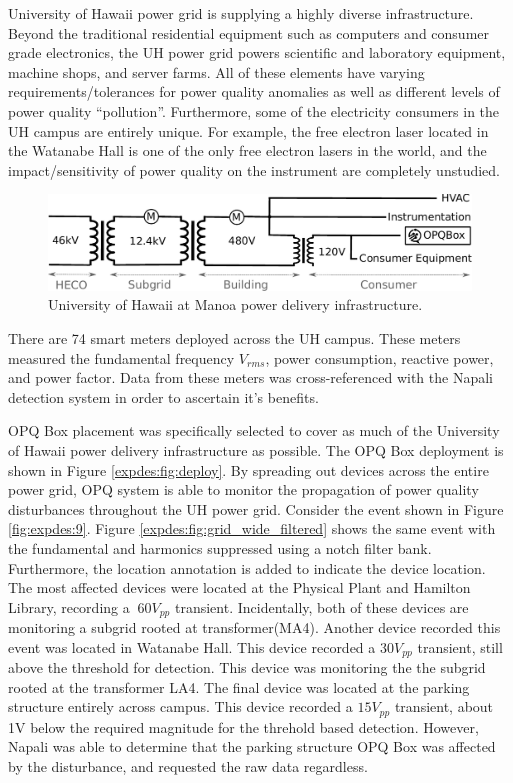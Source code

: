 University of Hawaii power grid is supplying a highly diverse infrastructure.
Beyond the traditional residential equipment such as computers and consumer grade electronics, the UH power grid powers scientific and laboratory equipment, machine shops, and server farms.
All of these elements have varying requirements/tolerances for power quality anomalies as well as different levels of power quality ``pollution''.
Furthermore, some of the electricity consumers in the UH campus are entirely unique.
For example, the free electron laser located in the Watanabe Hall is one of the only free electron lasers in the world, and the impact/sensitivity of power quality on the instrument are completely unstudied.
\begin{figure}[h]
    \centering
    \includegraphics[width=1\linewidth]{img/uh-grid.pdf}
    \caption{University of Hawaii at Manoa power delivery infrastructure.}
    \label{expdes:fig:1}
\end{figure}

There are 74 smart meters deployed across the UH campus.
These meters measured the fundamental frequency $V_{rms}$, power consumption, reactive power, and power factor.
Data from these meters was cross-referenced with the Napali detection system in order to ascertain it's benefits.

OPQ Box placement was specifically selected to cover as much of the University of Hawaii power delivery infrastructure as possible.
The OPQ Box deployment is shown in Figure \ref{expdes:fig:deploy}.
By spreading out devices across the entire power grid, OPQ system is able to monitor the propagation of power quality disturbances throughout the UH power grid.
Consider the event shown in Figure \ref{fig:expdes:9}.
Figure \ref{expdes:fig:grid_wide_filtered} shows the same event with the fundamental and harmonics suppressed using a notch filter bank.
Furthermore, the location annotation is added to indicate the device location.
The most affected devices were located at the Physical Plant and Hamilton Library, recording a $~60V_{pp}$ transient.
Incidentally, both of these devices are monitoring a subgrid rooted at transformer(MA4).
Another device recorded this event was located in Watanabe Hall.
This device recorded a $30V_{pp}$ transient, still above the threshold for detection.
This device was monitoring the the subgrid rooted at the transformer LA4.
The final device was located at the parking structure entirely across campus.
This device recorded a $15V_{pp}$ transient, about 1V below the required magnitude for the threhold based detection.
However, Napali was able to determine that the parking structure OPQ Box was affected by the disturbance, and requested the raw data regardless.

